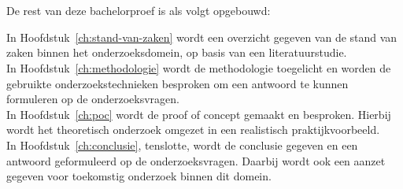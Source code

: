 \section{}%
\label{sec:opzet-bachelorproef}


De rest van deze bachelorproef is als volgt opgebouwd:

In Hoofdstuk~\ref{ch:stand-van-zaken} wordt een overzicht gegeven van de stand van zaken binnen het onderzoeksdomein, op basis van een literatuurstudie. \\
In Hoofdstuk~\ref{ch:methodologie} wordt de methodologie toegelicht en worden de gebruikte onderzoekstechnieken besproken om een antwoord te kunnen formuleren op de onderzoeksvragen. \\
In Hoofdstuk~\ref{ch:poc} wordt de proof of concept gemaakt en besproken. Hierbij wordt het theoretisch onderzoek omgezet in een realistisch praktijkvoorbeeld. \\
In Hoofdstuk~\ref{ch:conclusie}, tenslotte, wordt de conclusie gegeven en een antwoord geformuleerd op de onderzoeksvragen. Daarbij wordt ook een aanzet gegeven voor toekomstig onderzoek binnen dit domein.
